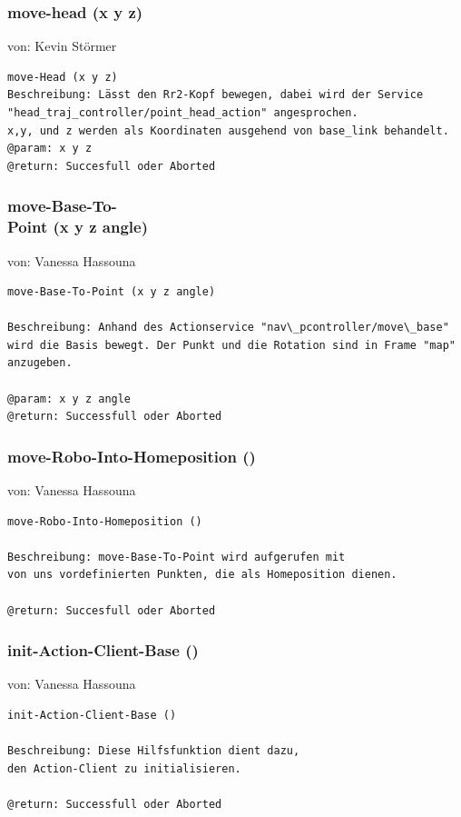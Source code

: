 \documentclass{suturo}
\makeatletter
\newcommand{\chapterauthor}[1]{%
  {\parindent0pt\vspace*{-27pt}%
  \linespread{0}\small\begin{flushright}von: #1\end{flushright}%
  \par\nobreak\vspace*{0pt}}
  \@afterheading%
}
\makeatother
\begin{document}
\subsubsection{move-head (x y z)}
\chapterauthor{Kevin Störmer}

\begin{verbatim}
move-Head (x y z)
Beschreibung: Lässt den Rr2-Kopf bewegen, dabei wird der Service 
"head_traj_controller/point_head_action" angesprochen.
x,y, und z werden als Koordinaten ausgehend von base_link behandelt.
@param: x y z
@return: Succesfull oder Aborted
\end{verbatim}



\subsubsection{move-Base-To-\\
Point (x y z angle)}
\chapterauthor{Vanessa Hassouna}
\begin{verbatim}
move-Base-To-Point (x y z angle)

Beschreibung: Anhand des Actionservice "nav\_pcontroller/move\_base" 
wird die Basis bewegt. Der Punkt und die Rotation sind in Frame "map" anzugeben.

@param: x y z angle
@return: Successfull oder Aborted
\end{verbatim}


\subsubsection{move-Robo-Into-Homeposition ()}
\chapterauthor{Vanessa Hassouna}
\begin{verbatim}
move-Robo-Into-Homeposition ()

Beschreibung: move-Base-To-Point wird aufgerufen mit 
von uns vordefinierten Punkten, die als Homeposition dienen.

@return: Succesfull oder Aborted
\end{verbatim}



\subsubsection{init-Action-Client-Base ()}
\chapterauthor{Vanessa Hassouna}
\begin{verbatim}
init-Action-Client-Base ()

Beschreibung: Diese Hilfsfunktion dient dazu, 
den Action-Client zu initialisieren.

@return: Successfull oder Aborted
\end{verbatim}
\end{document}
